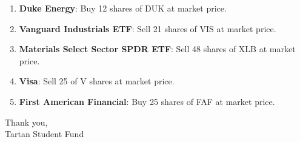 \documentclass[11pt,pressrelease]{newlfm} %
\begin{document}
\begin{newlfm}



\vspace{-.5 in}
\begin{singlespace} %

\begin{enumerate}
\item \textbf{Duke Energy}:  Buy 12 shares of DUK at market price.

\item  \textbf{Vanguard Industrials ETF}: Sell 21 shares of VIS at market price.

\item  \textbf{Materials Select Sector SPDR ETF}:  Sell 48 shares of XLB at market price.

\item \textbf{Visa}: Sell 25 of V shares at market price.

\item \textbf{First American Financial}: Buy 25 shares of FAF at market price.  

\end{enumerate}


Thank you, \\
Tartan Student Fund

\end{singlespace} %


\end{newlfm}
\end{document}
